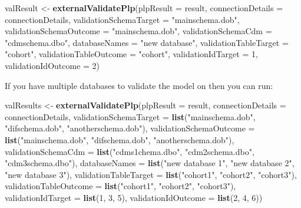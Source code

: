 \documentclass[11pt]{book}
\newenvironment{Shaded}{\begin{snugshade}}{\end{snugshade}}
\newcommand{\DataTypeTok}[1]{\textcolor[rgb]{0.13,0.29,0.53}{#1}}
\newcommand{\DecValTok}[1]{\textcolor[rgb]{0.00,0.00,0.81}{#1}}
\newcommand{\KeywordTok}[1]{\textcolor[rgb]{0.13,0.29,0.53}{\textbf{#1}}}
\newcommand{\NormalTok}[1]{#1}
\newcommand{\StringTok}[1]{\textcolor[rgb]{0.31,0.60,0.02}{#1}}
\theoremstyle{definition}
\theoremstyle{definition}
\theoremstyle{definition}
\theoremstyle{remark}
\begin{document}
\begin{Shaded}
\begin{Highlighting}[]
\NormalTok{valResult <-}\StringTok{ }\KeywordTok{externalValidatePlp}\NormalTok{(}\DataTypeTok{plpResult =}\NormalTok{ result, }\DataTypeTok{connectionDetails =}\NormalTok{ connectionDetails, }
    \DataTypeTok{validationSchemaTarget =} \StringTok{"mainschema.dob"}\NormalTok{, }\DataTypeTok{validationSchemaOutcome =} \StringTok{"mainschema.dob"}\NormalTok{, }
    \DataTypeTok{validationSchemaCdm =} \StringTok{"cdmschema.dbo"}\NormalTok{, }\DataTypeTok{databaseNames =} \StringTok{"new database"}\NormalTok{, }\DataTypeTok{validationTableTarget =} \StringTok{"cohort"}\NormalTok{, }
    \DataTypeTok{validationTableOutcome =} \StringTok{"cohort"}\NormalTok{, }\DataTypeTok{validationIdTarget =} \DecValTok{1}\NormalTok{, }\DataTypeTok{validationIdOutcome =} \DecValTok{2}\NormalTok{)}
\end{Highlighting}
\end{Shaded}

If you have multiple databases to validate the model on then you can run:

\begin{Shaded}
\begin{Highlighting}[]
\NormalTok{valResults <-}\StringTok{ }\KeywordTok{externalValidatePlp}\NormalTok{(}\DataTypeTok{plpResult =}\NormalTok{ result, }\DataTypeTok{connectionDetails =}\NormalTok{ connectionDetails, }
    \DataTypeTok{validationSchemaTarget =} \KeywordTok{list}\NormalTok{(}\StringTok{"mainschema.dob"}\NormalTok{, }\StringTok{"difschema.dob"}\NormalTok{, }\StringTok{"anotherschema.dob"}\NormalTok{), }
    \DataTypeTok{validationSchemaOutcome =} \KeywordTok{list}\NormalTok{(}\StringTok{"mainschema.dob"}\NormalTok{, }\StringTok{"difschema.dob"}\NormalTok{, }\StringTok{"anotherschema.dob"}\NormalTok{), }
    \DataTypeTok{validationSchemaCdm =} \KeywordTok{list}\NormalTok{(}\StringTok{"cdms1chema.dbo"}\NormalTok{, }\StringTok{"cdm2schema.dbo"}\NormalTok{, }\StringTok{"cdm3schema.dbo"}\NormalTok{), }
    \DataTypeTok{databaseNames =} \KeywordTok{list}\NormalTok{(}\StringTok{"new database 1"}\NormalTok{, }\StringTok{"new database 2"}\NormalTok{, }\StringTok{"new database 3"}\NormalTok{), }
    \DataTypeTok{validationTableTarget =} \KeywordTok{list}\NormalTok{(}\StringTok{"cohort1"}\NormalTok{, }\StringTok{"cohort2"}\NormalTok{, }\StringTok{"cohort3"}\NormalTok{), }\DataTypeTok{validationTableOutcome =} \KeywordTok{list}\NormalTok{(}\StringTok{"cohort1"}\NormalTok{, }
        \StringTok{"cohort2"}\NormalTok{, }\StringTok{"cohort3"}\NormalTok{), }\DataTypeTok{validationIdTarget =} \KeywordTok{list}\NormalTok{(}\DecValTok{1}\NormalTok{, }\DecValTok{3}\NormalTok{, }\DecValTok{5}\NormalTok{), }\DataTypeTok{validationIdOutcome =} \KeywordTok{list}\NormalTok{(}\DecValTok{2}\NormalTok{, }
        \DecValTok{4}\NormalTok{, }\DecValTok{6}\NormalTok{))}
\end{Highlighting}
\end{Shaded}
\end{document}
